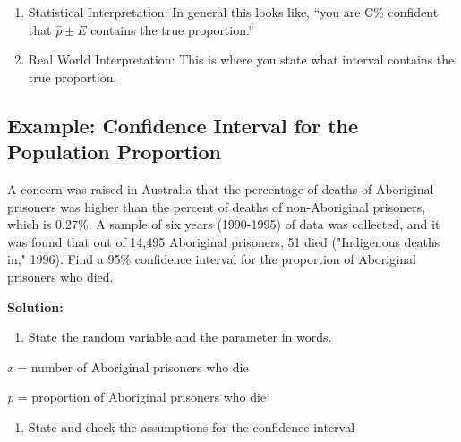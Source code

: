 \documentclass[
]{book}
\providecommand{\tightlist}{%
  \setlength{\itemsep}{0pt}\setlength{\parskip}{0pt}}
\begin{document}
\begin{enumerate}
\def\labelenumi{\arabic{enumi}.}
\setcounter{enumi}{3}
\item
  Statistical Interpretation: In general this looks like, ``you are C\% confident that \(\hat{p}\pm E\) contains the true proportion.''
\item
  Real World Interpretation: This is where you state what interval contains the true proportion.
\end{enumerate}

\hypertarget{example-confidence-interval-for-the-population-proportion}{%
\subsection{Example: Confidence Interval for the Population Proportion}\label{example-confidence-interval-for-the-population-proportion}}

A concern was raised in Australia that the percentage of deaths of Aboriginal prisoners was higher than the percent of deaths of non-Aboriginal prisoners, which is 0.27\%. A sample of six years (1990-1995) of data was collected, and it was found that out of 14,495 Aboriginal prisoners, 51 died ("Indigenous deaths in," 1996). Find a 95\% confidence interval for the proportion of Aboriginal prisoners who died.

\textbf{Solution:}

\begin{enumerate}
\def\labelenumi{\arabic{enumi}.}
\tightlist
\item
  State the random variable and the parameter in words.
\end{enumerate}

\emph{x} = number of Aboriginal prisoners who die

\emph{p} = proportion of Aboriginal prisoners who die

\begin{enumerate}
\def\labelenumi{\arabic{enumi}.}
\setcounter{enumi}{1}
\tightlist
\item
  State and check the assumptions for the confidence interval
\end{enumerate}
\end{document}

